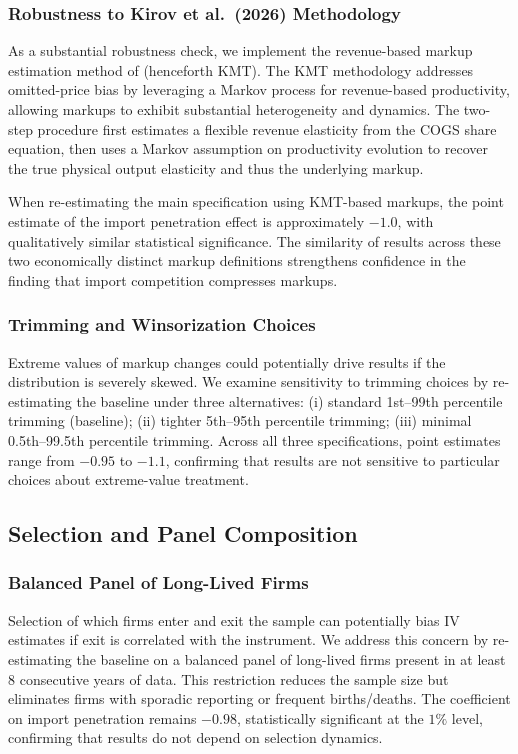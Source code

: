 \documentclass[12pt]{article}
\begin{document}
\subsubsection{Robustness to Kirov et al.~(2026) Methodology}

As a substantial robustness check, we implement the revenue-based markup estimation method of \cite{kirovMeasuringMarkupsRevenue2026} (henceforth KMT). The KMT methodology addresses omitted-price bias by leveraging a Markov process for revenue-based productivity, allowing markups to exhibit substantial heterogeneity and dynamics. The two-step procedure first estimates a flexible revenue elasticity from the COGS share equation, then uses a Markov assumption on productivity evolution to recover the true physical output elasticity and thus the underlying markup.

When re-estimating the main specification using KMT-based markups, the point estimate of the import penetration effect is approximately $-1.0$, with qualitatively similar statistical significance. The similarity of results across these two economically distinct markup definitions strengthens confidence in the finding that import competition compresses markups.

\subsubsection{Trimming and Winsorization Choices}

Extreme values of markup changes could potentially drive results if the distribution is severely skewed. We examine sensitivity to trimming choices by re-estimating the baseline under three alternatives: (i) standard 1st--99th percentile trimming (baseline); (ii) tighter 5th--95th percentile trimming; (iii) minimal 0.5th--99.5th percentile trimming. Across all three specifications, point estimates range from $-0.95$ to $-1.1$, confirming that results are not sensitive to particular choices about extreme-value treatment.

\subsection{Selection and Panel Composition}

\subsubsection{Balanced Panel of Long-Lived Firms}

Selection of which firms enter and exit the sample can potentially bias IV estimates if exit is correlated with the instrument. We address this concern by re-estimating the baseline on a balanced panel of long-lived firms present in at least 8 consecutive years of data. This restriction reduces the sample size but eliminates firms with sporadic reporting or frequent births/deaths. The coefficient on import penetration remains $-0.98$, statistically significant at the $1\%$ level, confirming that results do not depend on selection dynamics.
\end{document}
